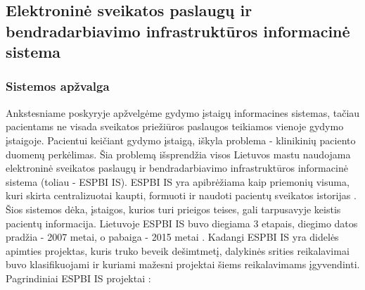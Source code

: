 \subsection{Elektroninė sveikatos paslaugų ir bendradarbiavimo infrastruktūros informacinė sistema}
\subsubsection{Sistemos apžvalga}
Ankstesniame poskyryje apžvelgėme gydymo įstaigų informacines sistemas, tačiau pacientams ne visada sveikatos priežiūros paslaugos teikiamos vienoje gydymo įstaigoje. Pacientui keičiant gydymo įstaigą, iškyla problema - klinikinių paciento duomenų perkėlimas. Šia problemą išsprendžia visos Lietuvos mastu naudojama elektroninė sveikatos paslaugų ir bendradarbiavimo infrastruktūros informacinė sistema (toliau - ESPBI IS). ESPBI IS yra apibrėžiama kaip priemonių visuma, kuri skirta centralizuotai kaupti, formuoti ir naudoti pacientų sveikatos istorijas \cite{ESPBINuostatos}. Šios sistemos dėka, įstaigos, kurios turi prieigos teises, gali tarpusavyje keistis pacientų informacija. Lietuvoje ESPBI IS buvo diegiama 3 etapais, diegimo datos pradžia - 2007 metai, o pabaiga - 2015 metai \cite{Ministras2015}. Kadangi ESPBI IS yra didelės apimties projektas, kuris truko beveik dešimtmetį, dalykinės srities reikalavimai buvo klasifikuojami ir kuriami mažesni projektai šiems reikalavimams įgyvendinti. Pagrindiniai ESPBI IS projektai \cite{Specifikacija}:
